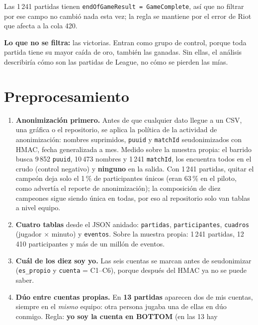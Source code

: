 \documentclass[11pt,letterpaper]{article}
\newcommand{\dato}[1]{\textbf{\textcolor{azul}{#1}}}
\begin{document}
\noindent Las 1\,241 partidas tienen \texttt{endOfGameResult = GameComplete}, así que
no filtrar por ese campo no cambió nada esta vez; la regla se mantiene por el error
de Riot que afecta a la cola 420.

\noindent \textbf{Lo que no se filtra:} las victorias. Entran como grupo de control,
porque toda partida tiene su mayor caída de oro, también las ganadas. Sin ellas, el
análisis describiría cómo son las partidas de League, no cómo se pierden las mías.

\section{Preprocesamiento}

\begin{enumerate}[leftmargin=1.6em,itemsep=.35em]
  \item \textbf{Anonimización primero.} Antes de que cualquier dato llegue a un CSV,
        una gráfica o el repositorio, se aplica la política de la actividad de
        anonimización: nombres suprimidos, \texttt{puuid} y \texttt{matchId}
        seudonimizados con HMAC, fecha generalizada a mes. Medido sobre la muestra
        propia: el barrido busca 9\,852 \texttt{puuid}, 10\,473 nombres y 1\,241
        \texttt{matchId}, los encuentra todos en el crudo (control negativo) y
        \dato{ninguno} en la salida. Con 1\,241 partidas, quitar el campeón deja
        solo el 1\,\% de participantes únicos (eran 63\,\% en el piloto, como
        advertía el reporte de anonimización); la composición de diez campeones
        sigue siendo única en todas, por eso al repositorio solo van tablas a nivel
        equipo.
  \item \textbf{Cuatro tablas} desde el JSON anidado: \texttt{partidas},
        \texttt{participantes}, \texttt{cuadros} (jugador × minuto) y
        \texttt{eventos}. Sobre la muestra propia: 1\,241 partidas, 12\,410
        participantes y más de un millón de eventos.
  \item \textbf{Cuál de los diez soy yo.} Las seis cuentas se marcan antes de
        seudonimizar (\texttt{es\_propio} y \texttt{cuenta} = C1--C6), porque después
        del HMAC ya no se puede saber.
  \item \textbf{Dúo entre cuentas propias.} En \dato{13 partidas} aparecen dos de mis
        cuentas, siempre en el \emph{mismo} equipo: otra persona jugaba una de ellas en
        dúo conmigo. Regla: \textbf{yo soy la cuenta en BOTTOM} (en las 13 hay

\end{enumerate}
\end{document}
